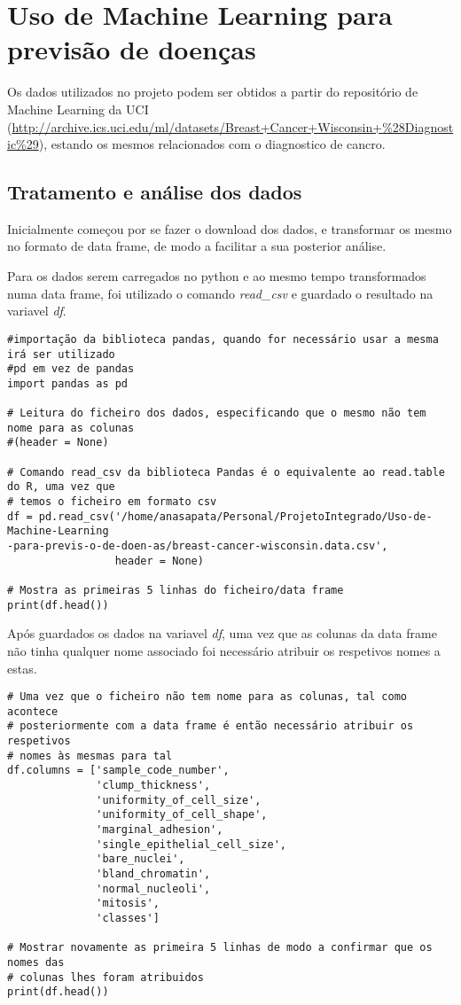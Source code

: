 \documentclass{article}
\begin{document}
\section{Uso de Machine Learning para previs\~ao de doen\c cas}

\quad Os dados utilizados no projeto podem ser obtidos a partir do reposit\'orio de Machine Learning da UCI (\url{http://archive.ics.uci.edu/ml/datasets/Breast+Cancer+Wisconsin+\%28Diagnostic\%29}), estando os mesmos relacionados com o diagnostico de cancro.

\subsection{Tratamento e an\'alise dos dados}

\quad Inicialmente começou por se fazer o download dos dados, e transformar os mesmo no formato de data frame, de modo a facilitar a sua posterior an\'alise.

Para os dados serem carregados no python e ao mesmo tempo transformados numa data frame, foi utilizado o comando \textit{read\_csv} e guardado o resultado na variavel \textit{df}.

\begin{lstlisting}
#importação da biblioteca pandas, quando for necessário usar a mesma irá ser utilizado 
#pd em vez de pandas
import pandas as pd

# Leitura do ficheiro dos dados, especificando que o mesmo não tem nome para as colunas 
#(header = None)

# Comando read_csv da biblioteca Pandas é o equivalente ao read.table do R, uma vez que
# temos o ficheiro em formato csv
df = pd.read_csv('/home/anasapata/Personal/ProjetoIntegrado/Uso-de-Machine-Learning
-para-previs-o-de-doen-as/breast-cancer-wisconsin.data.csv',
                 header = None)

# Mostra as primeiras 5 linhas do ficheiro/data frame
print(df.head())
\end{lstlisting}

Ap\'os guardados os dados na variavel \textit{df}, uma vez que as colunas da data frame n\~ao tinha qualquer nome associado foi necess\'ario atribuir os respetivos nomes a estas.

\begin{lstlisting}
# Uma vez que o ficheiro não tem nome para as colunas, tal como acontece 
# posteriormente com a data frame é então necessário atribuir os respetivos
# nomes às mesmas para tal
df.columns = ['sample_code_number',
              'clump_thickness',
              'uniformity_of_cell_size',
              'uniformity_of_cell_shape',
              'marginal_adhesion',
              'single_epithelial_cell_size',
              'bare_nuclei',
              'bland_chromatin',
              'normal_nucleoli',
              'mitosis',
              'classes']

# Mostrar novamente as primeira 5 linhas de modo a confirmar que os nomes das 
# colunas lhes foram atribuidos
print(df.head())
\end{lstlisting}
\end{document}
